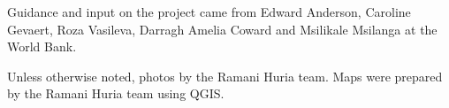 \documentclass[a4paper,12pt,twoside]{article}
\begin{document}
Guidance and input on the project came from Edward Anderson, Caroline Gevaert, Roza Vasileva, Darragh Amelia Coward and Msilikale Msilanga at the World Bank.

Unless otherwise noted, photos by the Ramani Huria team. Maps were prepared by the Ramani Huria team using QGIS.


\bigskip\bigskip\bigskip\bigskip\bigskip

\begin{center}

\medskip


\end{center}
\end{document}
